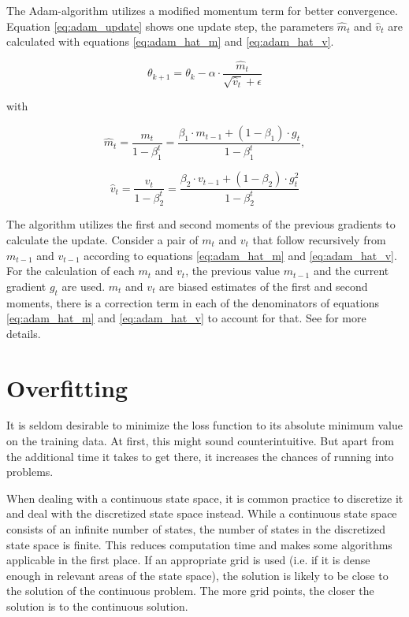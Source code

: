 The Adam-algorithm utilizes a modified momentum term for better convergence. Equation \ref{eq:adam_update} shows one update step, the parameters $\hat m_t$ and $\hat v_t$ are calculated with equations \ref{eq:adam_hat_m} and \ref{eq:adam_hat_v}.

\begin{equation}
\theta_{k+1}=\theta_k-\alpha\cdot\frac{\hat{m}_t}{\sqrt{\hat v_t}+\epsilon}
\label{eq:adam_update}
\end{equation}

with

\begin{equation}
\hat{m}_t= \frac{m_t}{1-\beta_1^t}= \frac{\beta_1\cdot m_{t-1}+(1-\beta_1)\cdot g_t}{1-\beta_1^t},
\label{eq:adam_hat_m}
\end{equation}


\begin{equation}
\hat v_t= \frac{v_t}{1-\beta_2^t}= \frac{\beta_2\cdot v_{t-1}+(1-\beta_2)\cdot g_t^2}{1-\beta_2^t}
\label{eq:adam_hat_v}
\end{equation}

The algorithm utilizes the first and second moments of the previous gradients to calculate the update. Consider a pair of $m_t$ and $v_t$ that follow recursively from $m_{t-1}$ and $v_{t-1}$ according to equations \ref{eq:adam_hat_m} and \ref{eq:adam_hat_v}. For the calculation of each $m_t$ and $v_t$, the previous value $m_{t-1}$ and the current gradient $g_t$ are used. $m_t$ and $v_t$ are biased estimates of the first and second moments, there is a correction term in each of the denominators of equations \ref{eq:adam_hat_m} and \ref{eq:adam_hat_v} to account for that. See \cite{DBLP:journals/corr/KingmaB14} for more details.

\section{Overfitting}

It is seldom desirable to minimize the loss function to its absolute minimum value on the training data. At first, this might sound counterintuitive. But apart from the additional time it takes to get there, it increases the chances of running into problems.

When dealing with a continuous state space, it is common practice to discretize it and deal with the discretized state space instead. While a continuous state space consists of an infinite number of states, the number of states in the discretized state space is finite. This reduces computation time and makes some algorithms applicable in the first place. If an appropriate grid is used (i.e. if it is dense enough in relevant areas of the state space), the solution is likely to be close to the solution of the continuous problem. The more grid points, the closer the solution is to the continuous solution.

